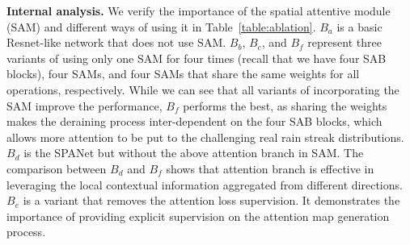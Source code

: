 \documentclass[10pt,twocolumn,letterpaper]{article}
\begin{document}
\begin{table*}[t]
\vspace{-2mm}
\centering
{}
\caption{Comparison on the test set from \cite{zhang:cvpr:2018:did}. SPANet is trained on the synthetic dataset from~\cite{zhang:cvpr:2018:did}.}
\label{table:syn}
\vspace{-3mm}
\end{table*}



{\bf Internal analysis.} We verify the importance of the spatial attentive module (SAM) and different ways of using it in Table~\ref{table:ablation}. $B_a$ is a basic Resnet-like network that does not use SAM. $B_b$, $B_c$, and $B_f$ represent three variants of using only one SAM for four times (recall that we have four SAB blocks), four SAMs, and four SAMs that share the same weights for all operations, respectively. While we can see that all variants of incorporating the SAM improve the performance, $B_f$ performs the best, as sharing the weights makes the deraining process inter-dependent on the four SAB blocks, which allows more attention to be put to the challenging real rain streak distributions.
$B_d$ is the SPANet but without the above attention branch in SAM. The comparison between $B_d$ and $B_f$ shows that attention branch is effective in leveraging the local contextual information aggregated from different directions.
$B_e$ is a variant that removes the attention loss supervision. It demonstrates the importance of providing explicit supervision on the attention map generation process.
\end{document}
